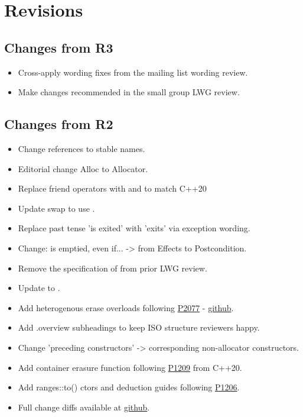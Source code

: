 \section{Revisions}

\subsection{Changes from R3}

\begin{itemize}
  \item Cross-apply wording fixes from the  mailing list wording review.
  \item Make changes recommended in the small group LWG review.
\end{itemize}

\subsection{Changes from R2}

\begin{itemize}
  \item Change references to stable names.
  \item Editorial change Alloc to Allocator.
  \item Replace friend operators with  and  to match C++20
  \item Update swap to use .
  \item Replace past tense 'is exited' with 'exits' via exception wording.
  \item {} Change:  is emptied, even if...  -> from Effects to Postcondition.
  \item Remove the specification of  from prior LWG review.
  \item Update  to .
  \item Add heterogenous erase overloads following \href{https://wg21.link/P2077}{P2077} - \href{https://github.com/tzlaine/flat_map/commit/a241df6b978479f0cc135ec567dbea4cd7407dd6}{github}.
  \item Add .overview subheadings to keep ISO structure reviewers happy.
  \item Change 'preceding constructors' -> corresponding non-allocator constructors.
  \item Add container erasure  function following \href{https://wg21.link/P1209}{P1209} from C++20.
  \item Add ranges::to() ctors and deduction guides following \href{https://wg21.link/P1206}{P1206}.
  \item Full change diffs available at \href{https://github.com/tzlaine/flat_map/commits/flat_set}{github}.
\end{itemize}

